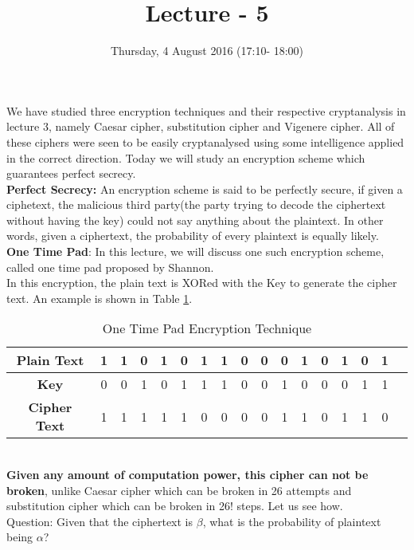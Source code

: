 \documentclass{llncs}
\title{Lecture - 5}
\author{Thursday, 4 August 2016 (17:10- 18:00)}
\institute{\textbf{Shannon's One Time Pad- A Perfectly Secure Encryption Technique}}
\begin{document}
\maketitle
\vspace{1cm}
We have studied three encryption techniques and their respective cryptanalysis in lecture 3, namely Caesar cipher, substitution cipher and Vigenere cipher. All of these ciphers were seen to be easily cryptanalysed using some intelligence applied in the correct direction. Today we will study an encryption scheme which guarantees perfect secrecy. \\

\textbf{Perfect Secrecy:} An encryption scheme is said to be perfectly secure, if given a ciphetext, the malicious third party(the party trying to decode the ciphertext without having the key) could not say anything about the plaintext. In other words, given a ciphertext, the probability of every plaintext is equally likely. \\

\textbf{One Time Pad}: In this lecture, we will discuss one such encryption scheme, called one time pad proposed by Shannon. \\
In this encryption, the plain text is XORed with the Key to generate the cipher text. An example is shown in Table \ref{sub}.
\begin{table}[h]
\begin{center}
\begin{tabular}{ |c|c|c|c|c|c|c|c|c|c|c|c|c|c|c|c|c }
\hline
\textbf{Plain Text} & 1 & 1 & 0 & 1 & 0 & 1 & 1 & 0 & 0 & 0 & 1 & 0 & 1 & 0 & 1 \\
\hline
\hline
\textbf{Key} & 0 & 0 & 1 & 0 & 1 & 1 & 1 & 0 & 0 & 1 & 0 & 0 & 0 & 1 & 1 \\
\hline
\textbf{Cipher Text}  & 1 & 1 & 1 & 1 & 1 & 0 & 0 & 0 & 0 & 1 & 1 & 0 & 1 & 1 & 0 \\
\hline
\end{tabular}
\vspace{2mm}
\caption{One Time Pad Encryption Technique}
\label{sub}
\end{center}
\end{table}\\
\textbf{Given any amount of computation power, this cipher can not be broken}, unlike Caesar cipher which can be broken in 26 attempts and substitution cipher which can be broken in 26! steps. Let us see how. \\

Question: Given that the ciphertext is $\beta$, what is the probability of plaintext being $\alpha$? \\
\end{document}
